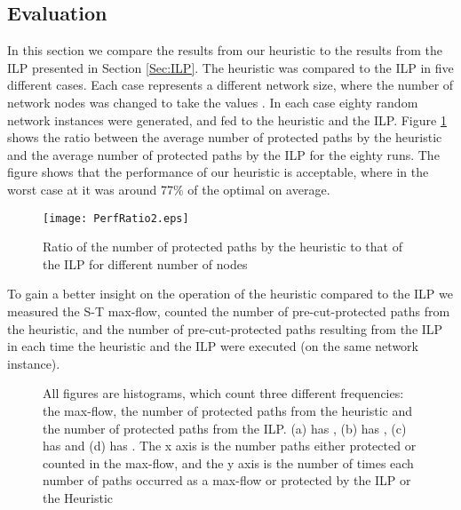 \documentclass[conference]{IEEEtran}
\begin{document}
\subsection{Evaluation}

In this section we compare the results from our heuristic to the results from the ILP presented in Section \ref{Sec:ILP}. The heuristic was compared to the ILP in five different cases. Each case represents a different network size, where the number of network nodes  was changed to take the values . In each case eighty random network instances were generated, and fed to the heuristic and the ILP. Figure \ref{Fig:PerfRatio} shows the ratio between the average number of protected paths by the heuristic and the average number of protected paths by the ILP for the eighty runs. The figure shows that the performance of our heuristic is acceptable, where in the worst case at  it was around 77\% of the optimal on average.
 
\begin{figure}[tbh]
\centering
\texttt{[image: PerfRatio2.eps]}
\caption{Ratio of the number of protected paths by the heuristic to that of the ILP for different number of nodes}
\label{Fig:PerfRatio}
\end{figure}

To gain a better insight on the operation of the heuristic compared to the ILP we measured the S-T max-flow, counted the number of pre-cut-protected paths from the heuristic, and the number of pre-cut-protected paths resulting from the ILP in each time the heuristic and the ILP were executed (on the same network instance). 

\begin{figure*}[htp]
\begin{center}
\end{center}
\caption{All figures are histograms, which count three different frequencies: the max-flow, the number of protected paths from the heuristic and the number of protected paths from the ILP. (a) has , (b) has , (c) has  and (d) has . The x axis is the number paths either protected or counted in the max-flow, and the y axis is the number of times each number of paths occurred as a max-flow or protected by the ILP or the Heuristic}
\label{Fig:Results}
\end{figure*}
\end{document}
